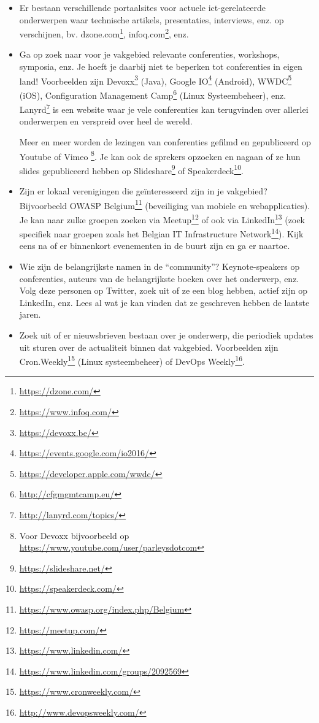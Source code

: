 \begin{itemize}
  \item Er bestaan verschillende portaalsites voor actuele ict-gerelateerde onderwerpen waar technische artikels, presentaties, interviews, enz. op verschijnen, bv. dzone.com\footnote{\url{https://dzone.com/}}, infoq.com\footnote{\url{https://www.infoq.com/}}, enz.
  
  \item Ga op zoek naar voor je vakgebied relevante conferenties, workshops, symposia, enz. Je hoeft je daarbij niet te beperken tot conferenties in eigen land! Voorbeelden zijn Devoxx\footnote{\url{https://devoxx.be/}} (Java), Google IO\footnote{\url{https://events.google.com/io2016/}} (Android), WWDC\footnote{\url{https://developer.apple.com/wwdc/}} (iOS), Configuration Management Camp\footnote{\url{http://cfgmgmtcamp.eu/}} (Linux Systeembeheer), enz. Lanyrd\footnote{\url{http://lanyrd.com/topics/}} is een website waar je vele conferenties kan terugvinden over allerlei onderwerpen en verspreid over heel de wereld.

  Meer en meer worden de lezingen van conferenties gefilmd en gepubliceerd op Youtube of Vimeo \footnote{Voor Devoxx bijvoorbeeld op \url{https://www.youtube.com/user/parleysdotcom}}. Je kan ook de sprekers opzoeken en nagaan of ze hun slides gepubliceerd hebben op Slideshare\footnote{\url{https://slideshare.net/}} of Speakerdeck\footnote{\url{https://speakerdeck.com/}}.
  
  \item Zijn er lokaal verenigingen die geïnteresseerd zijn in je vakgebied? Bijvoorbeeld OWASP Belgium\footnote{\url{https://www.owasp.org/index.php/Belgium}} (beveiliging van mobiele en webapplicaties). Je kan naar zulke groepen zoeken via Meetup\footnote{\url{https://meetup.com/}} of ook via LinkedIn\footnote{\url{https://www.linkedin.com/}} (zoek specifiek naar groepen zoals het Belgian IT Infrastructure Network\footnote{\url{https://www.linkedin.com/groups/2092569}}). Kijk eens na of er binnenkort evenementen in de buurt zijn en ga er naartoe.
  
  \item Wie zijn de belangrijkste namen in de ``community''? Keynote-speakers op conferenties, auteurs van de belangrijkste boeken over het onderwerp, enz. Volg deze personen op Twitter, zoek uit of ze een blog hebben, actief zijn op LinkedIn, enz. Lees al wat je kan vinden dat ze geschreven hebben de laatste jaren.
  
  \item Zoek uit of er nieuwsbrieven bestaan over je onderwerp, die periodiek updates uit sturen over de actualiteit binnen dat vakgebied. Voorbeelden zijn Cron.Weekly\footnote{\url{https://www.cronweekly.com/}} (Linux systeembeheer) of DevOps Weekly\footnote{\url{http://www.devopsweekly.com/}}.
\end{itemize}

